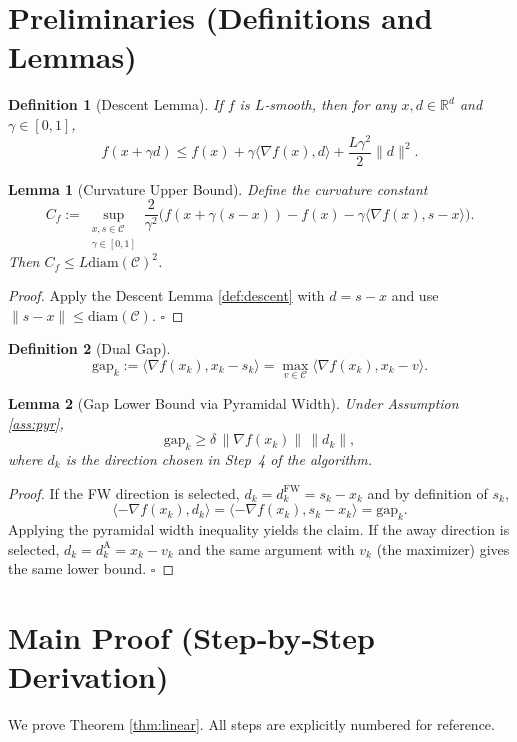 \documentclass{article}
\newtheorem{lemma}{Lemma}
\newtheorem{definition}{Definition}
\newcommand{\cC}{\mathcal{C}}
\newcommand{\gap}{\mathrm{gap}}
\newcommand{\diam}{\mathrm{diam}}
\begin{document}
\section*{Preliminaries (Definitions and Lemmas)}
\begin{definition}[Descent Lemma]\label{def:descent}
If $f$ is $L$‑smooth, then for any $x,d\in\mathbb{R}^d$ and $\gamma\in[0,1]$,
\[
f(x+\gamma d)\le f(x)+\gamma\langle\nabla f(x),d\rangle+\frac{L\gamma^{2}}{2}\|d\|^{2}.
\tag{DL}
\]
\end{definition}
\begin{lemma}[Curvature Upper Bound]\label{lem:curv}
Define the curvature constant
\[
C_f:=\sup_{\substack{x,s\in\cC\\\gamma\in[0,1]}}
\frac{2}{\gamma^{2}}\bigl(f(x+\gamma(s-x))-f(x)-\gamma\langle\nabla f(x),s-x\rangle\bigr).
\]
Then $C_f\le L\diam(\cC)^{2}$.
\end{lemma}
\begin{proof}
Apply the Descent Lemma \eqref{def:descent} with $d=s-x$ and use $\|s-x\|\le\diam(\cC)$. $\square$
\end{proof}
\begin{definition}[Dual Gap]\label{def:gap}
\[
\gap_k:=\langle\nabla f(x_k),x_k-s_k\rangle
      =\max_{v\in\cC}\langle\nabla f(x_k),x_k-v\rangle .
\]
\end{definition}
\begin{lemma}[Gap Lower Bound via Pyramidal Width]\label{lem:gap-width}
Under Assumption \ref{ass:pyr},
\[
\gap_k\ge \delta\,\|\nabla f(x_k)\|\,\|d_k\|,
\]
where $d_k$ is the direction chosen in Step~4 of the algorithm.
\end{lemma}
\begin{proof}
If the FW direction is selected, $d_k=d^{\text{FW}}_k=s_k-x_k$ and by definition of $s_k$,
\[
\langle-\nabla f(x_k),d_k\rangle
   =\langle-\nabla f(x_k),s_k-x_k\rangle
   =\gap_k .
\]
Applying the pyramidal width inequality yields the claim.  
If the away direction is selected, $d_k=d^{\text{A}}_k=x_k-v_k$ and the same argument with $v_k$ (the maximizer) gives the same lower bound. $\square$
\end{proof}

\section*{Main Proof (Step‑by‑Step Derivation)}
We prove Theorem \ref{thm:linear}.  
All steps are explicitly numbered for reference.
\end{document}
